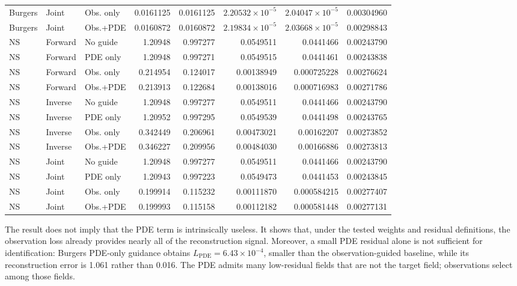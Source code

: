 \documentclass[twoside,11pt]{article}
\newcommand{\Lpde}{L_{\mathrm{PDE}}}
\begin{document}
\begin{table}[t]
{\begin{tabular}{lllrrrrr}
Burgers & Joint & Obs. only & 0.0161125 & 0.0161125 & $2.20532\!\times\!10^{-5}$ & $2.04047\!\times\!10^{-5}$ & 0.00304960 \\
Burgers & Joint & Obs.+PDE & 0.0160872 & 0.0160872 & $2.19834\!\times\!10^{-5}$ & $2.03668\!\times\!10^{-5}$ & 0.00298843 \\
\midrule
NS & Forward & No guide & 1.20948 & 0.997277 & 0.0549511 & 0.0441466 & 0.00243790 \\
NS & Forward & PDE only & 1.20948 & 0.997271 & 0.0549515 & 0.0441461 & 0.00243838 \\
NS & Forward & Obs. only & 0.214954 & 0.124017 & 0.00138949 & 0.000725228 & 0.00276624 \\
NS & Forward & Obs.+PDE & 0.213913 & 0.122684 & 0.00138016 & 0.000716983 & 0.00271786 \\
NS & Inverse & No guide & 1.20948 & 0.997277 & 0.0549511 & 0.0441466 & 0.00243790 \\
NS & Inverse & PDE only & 1.20952 & 0.997295 & 0.0549539 & 0.0441498 & 0.00243765 \\
NS & Inverse & Obs. only & 0.342449 & 0.206961 & 0.00473021 & 0.00162207 & 0.00273852 \\
NS & Inverse & Obs.+PDE & 0.346227 & 0.209956 & 0.00484030 & 0.00166886 & 0.00273813 \\
NS & Joint & No guide & 1.20948 & 0.997277 & 0.0549511 & 0.0441466 & 0.00243790 \\
NS & Joint & PDE only & 1.20943 & 0.997223 & 0.0549473 & 0.0441453 & 0.00243845 \\
NS & Joint & Obs. only & 0.199914 & 0.115232 & 0.00111870 & 0.000584215 & 0.00277407 \\
NS & Joint & Obs.+PDE & 0.199993 & 0.115158 & 0.00112182 & 0.000581448 & 0.00277131 \\
\bottomrule
\end{tabular}
}
\end{table}

The result does not imply that the PDE term is intrinsically useless.  It
shows that, under the tested weights and residual definitions, the observation
loss already provides nearly all of the reconstruction signal.  Moreover, a
small PDE residual alone is not sufficient for identification: Burgers
PDE-only guidance obtains \(\Lpde=6.43\times 10^{-4}\), smaller than the
observation-guided baseline, while its reconstruction error is 1.061 rather
than 0.016.  The PDE admits many low-residual fields that are not the target
field; observations select among those fields.
\end{document}
